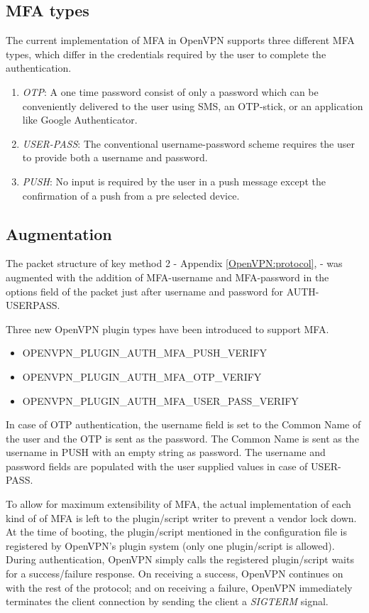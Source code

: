 \documentclass[11pt,oneside]{book}
\begin{document}
\subsection{MFA types}
The current implementation of MFA in OpenVPN supports three different MFA types, which differ
in the credentials required by the user to complete the authentication.

\begin{enumerate}
    \item \emph{OTP}: A one time password consist of only a password which can be conveniently
        delivered to the user using SMS, an OTP-stick, or an application like Google Authenticator.
    \item \emph{USER-PASS}: The conventional username-password scheme requires the user to provide
        both a username and password.
    \item \emph{PUSH}: No input is required by the user in a push message except the confirmation
        of a push from a pre selected device.
\end{enumerate}

\subsection{Augmentation}
The packet structure of key method 2 - Appendix \ref{OpenVPN:protocol}, \pageref{OpenVPN:protocol} -
was augmented with the addition of MFA-username and MFA-password in the options field of the packet
just after username and password for AUTH-USERPASS.

Three new OpenVPN plugin types have been introduced to support MFA.

\begin{itemize}
     \item OPENVPN\_PLUGIN\_AUTH\_MFA\_PUSH\_VERIFY
     \item OPENVPN\_PLUGIN\_AUTH\_MFA\_OTP\_VERIFY
     \item OPENVPN\_PLUGIN\_AUTH\_MFA\_USER\_PASS\_VERIFY
\end{itemize}

In case of OTP authentication, the username field is set to the Common Name of the user and the OTP
is sent as the password. The Common Name is sent as the username in PUSH with an empty string as
password. The username and password fields are populated with the user supplied values in case of
USER-PASS.

To allow for maximum extensibility of MFA, the actual implementation of each kind of of MFA
is left to the plugin/script writer to prevent a vendor lock down. At the time of booting,
the plugin/script mentioned in the configuration file is registered by OpenVPN's plugin
system (only one plugin/script is allowed). During authentication, OpenVPN simply calls the
registered plugin/script waits for a success/failure response. On receiving a success, OpenVPN
continues on with the rest of the protocol; and on receiving a failure, OpenVPN immediately
terminates the client connection by sending the client a \emph{SIGTERM} signal.
\end{document}
